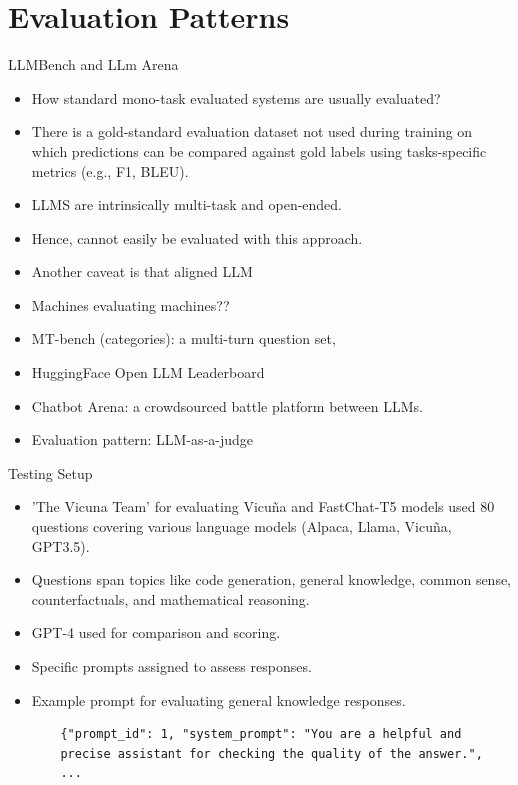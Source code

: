 \documentclass[handout]{beamer}
\begin{document}
\section{Evaluation Patterns}
\begin{frame}{LLMBench and LLm Arena}
\begin{scriptsize}
\begin{itemize}
\item How standard mono-task evaluated systems are usually evaluated?
\item There is a gold-standard evaluation dataset not used during training on which predictions can be compared against gold labels using tasks-specific metrics (e.g., F1, BLEU).
\item LLMS are intrinsically multi-task and open-ended.
\item Hence, cannot easily be evaluated with this approach.
\item Another caveat is that aligned LLM
\item Machines evaluating machines??
\item MT-bench (categories): a multi-turn question set,
\item HuggingFace Open LLM Leaderboard
\item Chatbot Arena: a crowdsourced battle platform between LLMs.
\item Evaluation pattern: LLM-as-a-judge
\end{itemize}
\end{scriptsize}
\end{frame}



\begin{frame}[fragile]{Testing Setup}
  \begin{itemize}
    \item'The Vicuna Team' for evaluating Vicuña and FastChat-T5 models used 80 questions covering various language models (Alpaca, Llama, Vicuña, GPT3.5).
    \item Questions span topics like code generation, general knowledge, common sense, counterfactuals, and mathematical reasoning.
    \item GPT-4 used for comparison and scoring.
    \item Specific prompts assigned to assess responses.
    \item Example prompt for evaluating general knowledge responses.
    \begin{scriptsize}
    \begin{verbatim}
    {"prompt_id": 1, "system_prompt": "You are a helpful and
    precise assistant for checking the quality of the answer.",
    ...
    \end{verbatim}
    \end{scriptsize}
  \end{itemize}
\end{frame}
\end{document}
